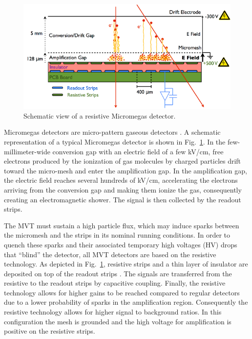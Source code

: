 \begin{figure}[!thb]
\begin{center}
\includegraphics[width=1.8\columnwidth,keepaspectratio]{images/mm_principle}
\end{center}

\caption{Schematic view of a resistive Micromegas detector.}
\label{fig:mm-principle}
\end{figure}

Micromegas detectors are micro-pattern gaseous detectors \cite{GIOMATARIS199629}. A schematic representation of a
typical Micromegas detector is shown in Fig.~\ref{fig:mm-principle}. In the few-millimeter-wide conversion gap with an
electric field of a few kV/cm, free electrons produced by the ionization of gas molecules by charged particles drift toward
the micro-mesh and enter the amplification gap. In the amplification gap, the electric field reaches several hundreds of
kV/cm, accelerating the electrons arriving from the conversion gap and making them ionize the gas, consequently creating an
electromagnetic shower. The signal is then collected by the readout strips.  

The MVT must sustain a high particle flux, which may induce sparks between the micromesh and the strips in its nominal
running conditions. In order to quench these sparks and their associated temporary high voltages (HV) drops that ``blind''
the detector, all MVT detectors are based on the resistive technology. As depicted in Fig.~\ref{fig:mm-principle}, resistive
strips and a thin layer of insulator are deposited on top of the readout strips \cite{ALEXOPOULOS2011110}. The signals are
transferred from the resistive to the readout strips by capacitive coupling. Finally, the resistive technology allows for higher
gains to be reached compared to regular detectors due to a lower probability of sparks in the amplification region.
Consequently the resistive technology allows for higher signal to background ratios. In this configuration the mesh is
grounded and the high voltage for amplification is positive on the resistive strips. 

